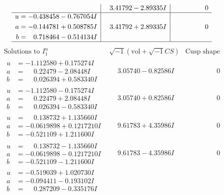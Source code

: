 \documentclass[1p]{elsarticle_modified}
\theoremstyle{definition}
\newcommand{\I}{\sqrt{-1}}
\begin{document}
$$\begin{array}{c|c|c}
 & \phantom{-}3.41792 - 2.89335 I & \phantom{-0.000000 } 0 \\ \hline\begin{aligned}
u &= -0.438458 - 0.767054 I \\
a &= -0.144781 + 0.508785 I \\
b &= \phantom{-}0.718464 - 0.514134 I\end{aligned}
 & \phantom{-}3.41792 + 2.89335 I & \phantom{-0.000000 } 0\\
 \hline 
 \end{array}$$\newpage$$\begin{array}{c|c|c}  
\text{Solutions to }I^u_{1}& \I (\text{vol} + \sqrt{-1}CS) & \text{Cusp shape}\\
 \hline 
\begin{aligned}
u &= -1.112580 + 0.175274 I \\
a &= \phantom{-}0.22479 - 2.08448 I \\
b &= \phantom{-}0.026394 + 0.583340 I\end{aligned}
 & \phantom{-}3.05740 - 0.82586 I & \phantom{-0.000000 } 0 \\ \hline\begin{aligned}
u &= -1.112580 - 0.175274 I \\
a &= \phantom{-}0.22479 + 2.08448 I \\
b &= \phantom{-}0.026394 - 0.583340 I\end{aligned}
 & \phantom{-}3.05740 + 0.82586 I & \phantom{-0.000000 } 0 \\ \hline\begin{aligned}
u &= \phantom{-}0.138732 + 1.135660 I \\
a &= -0.0619898 + 0.1217210 I \\
b &= -0.521109 + 1.211600 I\end{aligned}
 & \phantom{-}9.61783 + 4.35986 I & \phantom{-0.000000 } 0 \\ \hline\begin{aligned}
u &= \phantom{-}0.138732 - 1.135660 I \\
a &= -0.0619898 - 0.1217210 I \\
b &= -0.521109 - 1.211600 I\end{aligned}
 & \phantom{-}9.61783 - 4.35986 I & \phantom{-0.000000 } 0 \\ \hline\begin{aligned}
u &= -0.519039 + 1.020730 I \\
a &= -0.094411 - 0.193102 I \\
b &= \phantom{-}0.287209 - 0.335176 I\end{aligned}

\end{array}$$
\end{document}
